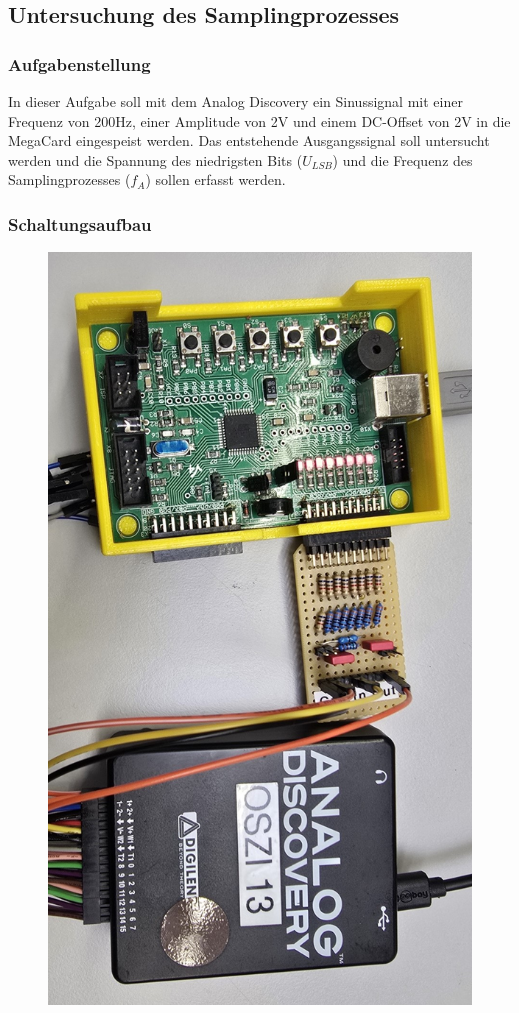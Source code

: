 \documentclass{article}
\begin{document}
\subsection{Untersuchung des Samplingprozesses}
\subsubsection{Aufgabenstellung}
In dieser Aufgabe soll mit dem Analog Discovery ein Sinussignal mit einer Frequenz von 200Hz, einer Amplitude von 2V und einem DC-Offset von 2V in die MegaCard eingespeist werden. Das entstehende Ausgangssignal soll untersucht werden und die Spannung des niedrigsten Bits ($U_{LSB}$) und die Frequenz des Samplingprozesses ($f_A$) sollen erfasst werden.

\subsubsection{Schaltungsaufbau}
\begin{figure}[h]
    \centering
    \includegraphics[angle=90,width=0.8\linewidth]{img/Aufbau_01.jpg}
\end{figure}
\end{document}
